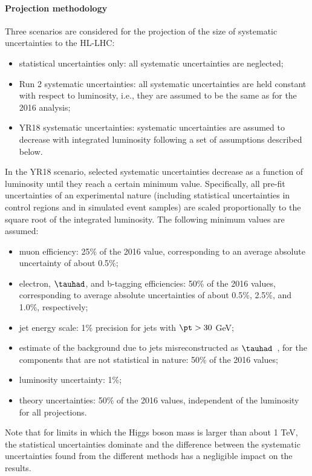 \paragraph{Projection methodology}
\label{sec:method}
%
Three scenarios are considered for the projection of the size of
systematic uncertainties to the HL-LHC:
\begin{itemize}
\item
statistical uncertainties only: all systematic uncertainties are neglected;
\item
  Run 2 systematic uncertainties: all systematic uncertainties are held
  constant with respect to luminosity, i.e., they are assumed to be
  the same as for the 2016 analysis;
\item
  YR18 systematic uncertainties: systematic uncertainties are assumed to
  decrease with integrated luminosity
  following a set of assumptions described below.
\end{itemize}

In the YR18 scenario,
selected systematic uncertainties decrease
as a function of luminosity until they reach a certain minimum value. 
Specifically, all pre-fit uncertainties of an experimental nature
(including statistical uncertainties in control regions and
in simulated event samples) 
are scaled proportionally to the square root of the integrated luminosity.
The following minimum values are assumed:
\vspace{-0.2cm}
\begin{itemize}
\item
muon efficiency: 25\% of the 2016 value, corresponding to an average absolute uncertainty of about 0.5\%; 
\item
electron, $\tauhad$, and b-tagging efficiencies: 50\% of the 2016 values, 
corresponding to average absolute uncertainties
of about 0.5\%, 2.5\%, and 1.0\%, respectively;
\item
jet energy scale: 1\% precision for jets with $\pt > 30$ GeV; %
\item
  estimate of the background due to jets misreconstructed
  as $\tauhad$~\cite{HIG-15-007},
  for the components that are not statistical in nature:
  50\% of the 2016 values;
\item
luminosity uncertainty: 1\%;
\item
  theory uncertainties: 50\% of the 2016 values,
  independent of the luminosity for all projections.
\end{itemize}
Note that for limits in which the Higgs boson mass is larger than about 1 TeV,
the statistical uncertainties dominate and
the difference between the systematic uncertainties found from
the different methods has a negligible impact on the results.


